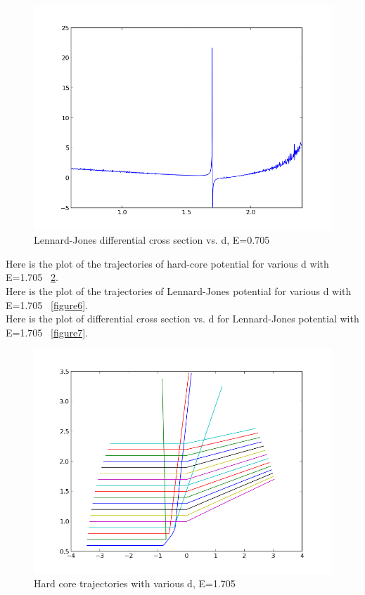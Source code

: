 \documentclass[11pt,letterpaper]{article}
\begin{document}
\begin{figure}
\begin{center}
\includegraphics[width=0.9\linewidth,angle=0]{p2diffE0705.png}
\caption{Lennard-Jones differential cross section vs. d, E=0.705}
\label{figure4}
\end{center}
\end{figure}




Here is the plot of the trajectories of hard-core potential for various d with E=1.705 ~\ref{figure5}.\\
Here is the plot of the trajectories of Lennard-Jones potential for various d with E=1.705 ~\ref{figure6}.\\
Here is the plot of differential cross section vs. d for Lennard-Jones potential with E=1.705 ~\ref{figure7}.\\


\begin{figure}
\begin{center}
\includegraphics[width=0.9\linewidth,angle=0]{p2allhard1715.png}
\caption{Hard core trajectories with various d, E=1.705}
\label{figure5}
\end{center}
\end{figure}
\end{document}
